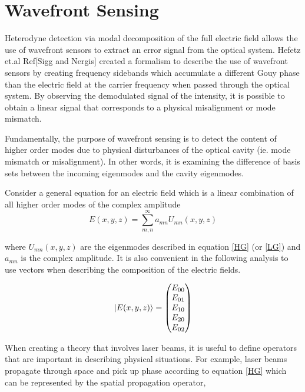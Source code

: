 \documentclass[oneside]{book}
\begin{document}
		
		
		
		\section{Wavefront Sensing}\label{WFS}
		Heterodyne detection via modal decomposition of the full electric field allows the use of wavefront sensors to extract an error signal from the optical system.  Hefetz et.al Ref[Sigg and Nergis] created a formalism to describe the use of wavefront sensors by creating frequency sidebands which accumulate a different Gouy phase than the electric field at the carrier frequency when passed through the optical system.  By observing the demodulated signal of the intensity, it is possible to obtain a linear signal that corresponds to a physical misalignment or mode mismatch.
		
		Fundamentally, the purpose of wavefront sensing is to detect the content of higher order modes due to physical disturbances of the optical cavity (ie. mode mismatch or misalignment).  In other words, it is examining the difference of basis sets between the incoming eigenmodes and the cavity eigenmodes.
		
		Consider a general equation for an electric field which is a linear combination of all higher order modes of the complex amplitude
		\begin{equation}
		E(x,y,z) = \sum\limits_{m,n}^{\infty} a_{mn} U_{mn}(x,y,z)
		\end{equation}
		
		where $ U_{mn}(x,y,z)$ are the eigenmodes described in equation \ref{HG} (or \ref{LG}) and $a_{mn}$ is the complex amplitude.  It is also convenient in the following analysis to use vectors when describing the composition of the electric fields.
		
		\begin{equation}
		\ket{E(x,y,z)} = \begin{pmatrix} E_{00} 
		\\ E_{01}
		\\E_{10}
		\\E_{20}
		\\E_{02}
		\end{pmatrix}
		\end{equation}

		When creating a theory that involves laser beams, it is useful to define operators that are important in describing physical situations.  For example, laser beams propagate through space and pick up phase according to equation \ref{HG} which can be represented by the spatial propagation operator,
		
\end{document}
